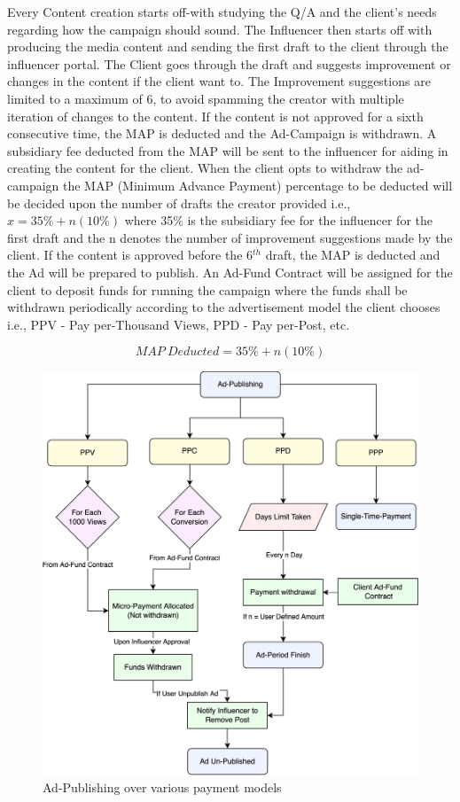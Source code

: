 \documentclass[10pt]{article}
\begin{document}
Every Content creation starts off-with studying the Q/A and the client's needs regarding how the campaign should sound. The Influencer then starts off with producing the media content and sending the first draft to the client through the influencer portal. The Client goes through the draft and suggests improvement or changes in the content if the client want to. The Improvement suggestions are limited to a maximum of 6, to avoid spamming the creator with multiple iteration of changes to the content. If the content is not approved for a sixth consecutive time, the MAP is deducted and the Ad-Campaign is withdrawn. A subsidiary fee deducted from the MAP will be sent to the influencer for aiding in creating the content for the client. When the client opts to withdraw the ad-campaign the MAP (Minimum Advance Payment) percentage to be deducted will be decided upon the number of drafts the creator provided i.e., $x=35\%+n(10\%)$ where 35\% is the subsidiary fee for the influencer for the first draft and the n denotes the number of improvement suggestions made by the client. If the content is approved before the 6$^{th}$ draft, the MAP is deducted and the Ad will be prepared to publish. An Ad-Fund Contract will be assigned for the client to deposit funds for running the campaign where the funds shall be withdrawn periodically according to the advertisement model the client chooses i.e., PPV - Pay per-Thousand Views, PPD - Pay per-Post, etc.

\begin{equation}
MAP\:Deducted=35\%+n(10\%)
\end{equation}

\begin{figure}[H]
\begin{center}
\includegraphics[width=13cm]{ad-publish}
\caption{Ad-Publishing over various payment models}
\end{center}
\end{figure}
\end{document}
